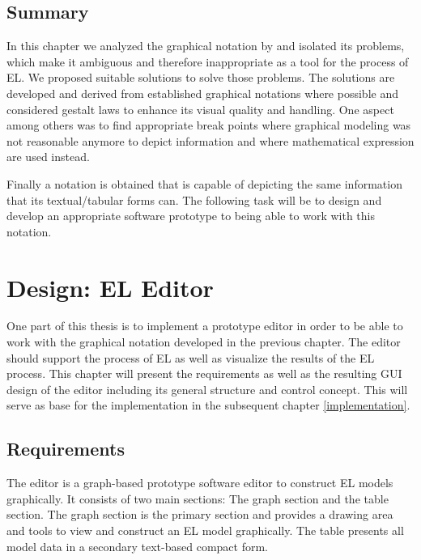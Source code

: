 \documentclass[twoside, openright, 12pt]{book}
\begin{document}
\section{Summary}
\label{gsl_summary}
In this chapter we analyzed the graphical notation by \cite{Amthor18} and isolated its problems, which make it ambiguous and therefore inappropriate as a tool for the process of EL.
We proposed suitable solutions to solve those problems.
The solutions are developed and derived from established graphical notations where possible and considered gestalt laws to enhance its visual quality and handling.
One aspect among others was to find appropriate break points where graphical modeling was not reasonable anymore to depict information and where mathematical expression are used instead.

Finally a notation is obtained that is capable of depicting the same information that its textual/tabular forms can.
The following task will be to design and develop an appropriate software prototype to being able to work with this notation.





\cleardoublepage
\chapter{Design: EL Editor}
\label{editor}
One part of this thesis is to implement a prototype editor in order to be able to work with the graphical notation developed in the previous chapter.
The editor should support the process of EL as well as visualize the results of the EL process.
This chapter will present the requirements as well as the resulting GUI design of the editor including its general structure and control concept.
This will serve as base for the implementation in the subsequent chapter \ref{implementation}.




\section{Requirements}
\label{editor_requirements}
The editor is a graph-based prototype software editor to construct EL models graphically.
It consists of two main sections: The graph section and the table section.
The graph section is the primary section and provides a drawing area and tools to view and construct an EL model graphically.
The table presents all model data in a secondary text-based compact form.
\end{document}
